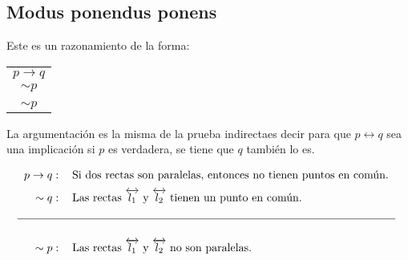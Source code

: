 \subsection{Modus ponendus ponens}
Este es un razonamiento de la forma:
\begin{center}
 \begin{tabular}{c}
$p\longrightarrow q$\\
$\sim p$ \\
\hline \\
$\sim p$
 \end{tabular}
\end{center}
La argumentaci\'on es la misma de la prueba indirectaes decir para que
$p\longleftrightarrow q$ sea una implicaci\'on si $p$ es verdadera, se tiene
que $q$ tambi\'en lo es.
\begin{ejemplo}{\[%
\begin{tabular}
[t]{rl}%
$p\rightarrow q:$ & Si dos rectas son paralelas, entonces no tienen puntos
en común.\medskip\\
$\sim q:$ & Las rectas $\overleftrightarrow{l_{1}}$ y $\overleftrightarrow
{l_{2}}$ tienen un punto en común.\medskip \medskip \\\hline
\medskip  \\
$\sim p:$ & Las rectas $\overleftrightarrow{l_{1}}$ y $\overleftrightarrow
{l_{2}}$ no son paralelas.
\end{tabular}
\
\]}
 \end{ejemplo}

